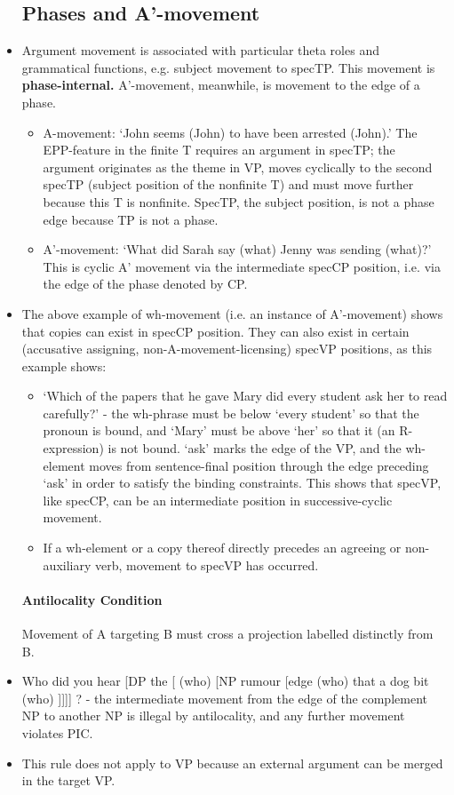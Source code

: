 \documentclass{article}
\begin{document}
\begin{itemize}
    \subsection{Phases and A'-movement}
    \item Argument movement is associated with particular theta roles and grammatical functions, e.g. subject movement to specTP. This movement is \textbf{phase-internal.} A'-movement, meanwhile, is movement to the edge of a phase.
    \begin{itemize}
        \item A-movement: `John seems (John) to have been arrested (John).' The EPP-feature in the finite T requires an argument in specTP; the argument originates as the theme in VP, moves cyclically to the second specTP (subject position of the nonfinite T) and must move further because this T is nonfinite. SpecTP, the subject position, is not a phase edge because TP is not a phase.
        \item A'-movement: `What did Sarah say (what) Jenny was sending (what)?' This is cyclic A' movement via the intermediate specCP position, i.e. via the edge of the phase denoted by CP.
    \end{itemize}
    \item The above example of wh-movement (i.e. an instance of A'-movement) shows that copies can exist in specCP position. They can also exist in certain (accusative assigning, non-A-movement-licensing) specVP positions, as this example shows:
    \begin{itemize}
        \item `Which of the papers that he gave Mary did every student ask her to read carefully?' - the wh-phrase must be below `every student' so that the pronoun is bound, and `Mary' must be above `her' so that it (an R-expression) is not bound. `ask' marks the edge of the VP, and the wh-element moves from sentence-final position through the edge preceding `ask' in order to satisfy the binding constraints. This shows that specVP, like specCP, can be an intermediate position in successive-cyclic movement.
        \item If a wh-element or a copy thereof directly precedes an agreeing or non-auxiliary verb, movement to specVP has occurred.
    \end{itemize}
    \paragraph{Antilocality Condition} Movement of A targeting B must cross a projection labelled distinctly from B.
    \item Who did you hear [DP the  [ (who) [NP rumour [edge (who) that a dog bit (who) ]]]] ? - the intermediate movement from the edge of the complement NP to another NP is illegal by antilocality, and any further movement violates PIC.
    \item This rule does not apply to VP because an external argument can be merged in the target VP.

\end{itemize}
\end{document}
